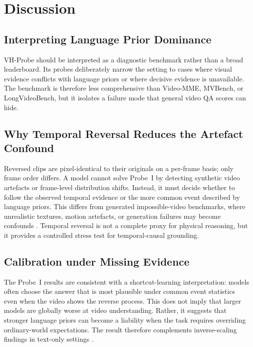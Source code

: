\documentclass[final,5p,times,twocolumn]{elsarticle}
\begin{document}
\section{Discussion}
\label{sec:discussion}

\subsection{Interpreting Language Prior Dominance}

VH-Probe should be interpreted as a diagnostic benchmark rather than a broad
leaderboard. Its probes deliberately narrow the setting to
cases where visual evidence conflicts with language priors or where decisive
evidence is unavailable. The benchmark is therefore less comprehensive than
Video-MME, MVBench, or LongVideoBench, but it isolates a failure mode that
general video QA scores can hide.

\subsection{Why Temporal Reversal Reduces the Artefact Confound}

Reversed clips are pixel-identical to their originals on a per-frame basis;
only frame order differs. A model cannot solve Probe~I by detecting synthetic
video artefacts or frame-level distribution shifts. Instead, it must decide
whether to follow the observed temporal evidence or the more common event
described by language priors. This differs from generated impossible-video
benchmarks, where unrealistic textures, motion artefacts, or generation
failures may become confounds \cite{bai2025impossible}. Temporal
reversal is not a complete proxy for physical reasoning, but it provides a
controlled stress test for temporal-causal grounding.

\subsection{Calibration under Missing Evidence}

The Probe~I results are consistent with a shortcut-learning interpretation:
models often choose the answer that is most plausible under common event
statistics even when the video shows the reverse process. This does not imply
that larger models are globally worse at video understanding. Rather, it
suggests that stronger language priors can become a liability when the task
requires overriding ordinary-world expectations. The result therefore
complements inverse-scaling findings in text-only settings
\cite{mckenzie2023inverse,wei2023inverse,shi2023large}.
\end{document}
